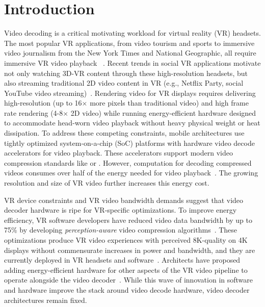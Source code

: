 \section{Introduction}

Video decoding is a critical motivating workload for virtual reality (VR) headsets.
The most popular VR applications, from \threesixty video tourism and sports to immersive video journalism from the New York Times and National Geographic, all require immersive VR video playback ~\cite{nytvr,nationalgeographic-vr}.
Recent trends in social VR applications motivate not only watching 3D-\threesixty VR content through these high-resolution headsets, but also streaming traditional 2D video content in VR (e.g., Netflix Party, social YouTube video streaming)~\cite{netflixparty}.
Rendering video for VR displays requires delivering high-resolution (up to 16$\times$ more pixels than traditional video) and high frame rate rendering (4-8$\times$ 2D video) while running energy-efficient hardware designed to accommodate head-worn video playback without heavy physical weight or heat dissipation.
To address these competing constraints, mobile architectures use tightly optimized system-on-a-chip (SoC) platforms with hardware video decode accelerators for video playback.
These accelerators support modern video compression standards like \hevc or \vpnine.
However, computation for decoding compressed videos consumes over half of the energy needed for video playback~\cite{google2018asplos,hevcThesis}.
The growing resolution and size of VR video further increases this energy cost.

\foveatedExampleFigure

VR device constraints and VR video bandwidth demands suggest that video decoder hardware is ripe for VR-specific optimizations.
To improve energy efficiency, VR software developers have reduced video data bandwidth by up to 75\% by developing \emph{perception-aware} video compression algorithms~\cite{guenter2012foveated,patney2017perceptual, visualcloud2017haynes,rubiks,fov-cloud-ryoo}.
These optimizations produce VR video experiences with perceived 8K-quality on 4K displays without commensurate increases in power and bandwidth, and they are currently deployed in VR headsets and software~\cite{htc-vive-pro-eye, patney2017perceptual, kaplanyan2019deepfovea}.
Architects have proposed adding energy-efficient hardware for other aspects of the VR video pipeline to operate alongside the video decoder~\cite{evr19isca, leng2018semantic, xie2018perception, zhang2017race}.
While this wave of innovation in software and hardware improve the stack around video decode hardware, video decoder architectures remain fixed.

